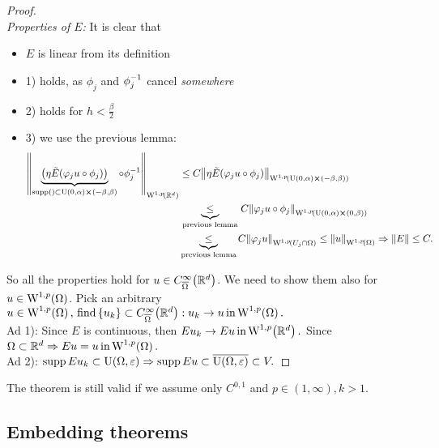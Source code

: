 \documentclass{article}
\begin{document}
\begin{proof}
   \\
   \textit{Properties of $E$:}
   It is clear that
   \begin{itemize}
	   \item $E$ is linear from its definition
	   \item 1) holds, as $\phi_j$ and $\phi_j^{-1}$ cancel \textit{somewhere}
	   \item 2) holds for $h<\frac{\beta}{2}$ 
	   \item 3) we use the previous lemma:
		   \begin{align*}
			   \norm{\underbrace{\qty(\eta \tilde{E}\qty(\varphi_j u \circ \phi_j))}_{\supp () \subset \text{U}(0,\alpha) \cross (-\beta, \beta)} \circ \inverse{\phi_j}}_{\WkpSet[1][p]{\R^d}} & \leq C \norm{\eta \tilde{E}\qty(\varphi_j u \circ \phi_j)}_{\WkpSet[1][p]{\text{U}(0,\alpha) \cross (-\beta, \beta)}} \\ &\underbrace{\leq}_{\, \text{previous lemma} \,} C \norm{\varphi_j u \circ \phi_j}_{\WkpSet[1][p]{\text{U}(0,\alpha) \cross (0,\beta)}}\\ &\underbrace{\leq}_{\text{previous lemma}} C \norm{\varphi_j u}_{\WkpSet[1][p]{U_j \cap \Omega}} \leq \norm{u}_{\WkpSet[1][p]{\Omega}} \Rightarrow \norm{E} \leq C.
		   \end{align*}
   \end{itemize}
   So all the properties hold for $u \in C^{\infty}_{\overline{\Omega}}\qty({\mathbb R}^d)$. We need to show them also for $u \in \WkpSet[1][p]{\Omega}$. Pick an arbitrary $u \in \WkpSet[1][p]{\Omega}, \, \text{find} \, \{u_k\} \subset C^{\infty}_{\overline{\Omega}}\qty(\R^d): u_k \to u \, \text{in} \, \WkpSet[1][p]{\Omega}.$ \\
   Ad 1): Since $E$ is continuous, then $E u_k \to Eu \, \text{in} \, \WkpSet[1][p]{\R^d}.$ Since $\Omega \subset \R^d \Rightarrow Eu=u \, \text{in} \, \WkpSet[1][p]{\Omega}.$ \\
   Ad 2): $\operatorname{supp} Eu_k \subset \text{U}(\Omega,\varepsilon) \Rightarrow \operatorname{supp} Eu \subset \overline{\text{U}(\Omega,\varepsilon)} \subset V.$

\end{proof}

\begin{remark}
    The theorem is still valid if we assume only $C^{0,1}$ and $p \in (1,\infty), k>1.$
\end{remark}

\subsection{Embedding theorems}
\label{sec:embedding}
\end{document}
